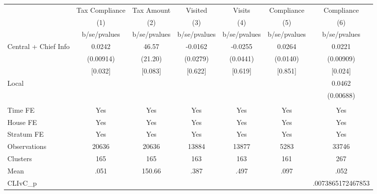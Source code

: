 {
\def\sym#1{\ifmmode^{#1}\else\(^{#1}\)\fi}
\begin{tabular}{l*{6}{c}}
\toprule
                &\multicolumn{1}{c}{Tax Compliance}&\multicolumn{1}{c}{Tax Amount}&\multicolumn{1}{c}{Visited}&\multicolumn{1}{c}{Visits}&\multicolumn{1}{c}{Compliance}&\multicolumn{1}{c}{Compliance}\\
                &\multicolumn{1}{c}{(1)}&\multicolumn{1}{c}{(2)}&\multicolumn{1}{c}{(3)}&\multicolumn{1}{c}{(4)}&\multicolumn{1}{c}{(5)}&\multicolumn{1}{c}{(6)}\\
                &b/se/pvalues&b/se/pvalues&b/se/pvalues&b/se/pvalues&b/se/pvalues&b/se/pvalues\\
\midrule
Central + Chief Info&   0.0242&    46.57&  -0.0162&  -0.0255&   0.0264&   0.0221\\
                &(0.00914)&  (21.20)& (0.0279)& (0.0441)& (0.0140)&(0.00909)\\
                &  [0.032]&  [0.083]&  [0.622]&  [0.619]&  [0.851]&  [0.024]\\
Local           &         &         &         &         &         &   0.0462\\
                &         &         &         &         &         &(0.00688)\\
                &         &         &         &         &         &         \\
Time FE         &      Yes&      Yes&      Yes&      Yes&      Yes&      Yes\\
House FE        &      Yes&      Yes&      Yes&      Yes&      Yes&      Yes\\
Stratum FE      &      Yes&      Yes&      Yes&      Yes&      Yes&      Yes\\
\midrule
Observations    &    20636&    20636&    13884&    13877&     5283&    33746\\
Clusters        &      165&      165&      163&      163&      161&      267\\
Mean            &     .051&   150.66&     .387&     .497&     .097&     .052\\
CLIvC\_p         &         &         &         &         &         &.0073865172467853\\
\bottomrule
\end{tabular}
}
